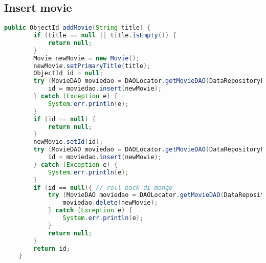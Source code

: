 \subsection{Insert movie}
\begin{lstlisting}[language=Java, caption = Movie insertion]
public ObjectId addMovie(String title) {
        if (title == null || title.isEmpty()) {
            return null;
        }
        Movie newMovie = new Movie();
        newMovie.setPrimaryTitle(title);
        ObjectId id = null;
        try (MovieDAO moviedao = DAOLocator.getMovieDAO(DataRepositoryEnum.MONGO)) {
            id = moviedao.insert(newMovie);
        } catch (Exception e) {
            System.err.println(e);
        }
        if (id == null) {
            return null;
        }
        newMovie.setId(id);
        try (MovieDAO moviedao = DAOLocator.getMovieDAO(DataRepositoryEnum.NEO4j)) {
            id = moviedao.insert(newMovie);
        } catch (Exception e) {
            System.err.println(e);
        }
        if (id == null){ // roll back di mongo
            try (MovieDAO moviedao = DAOLocator.getMovieDAO(DataRepositoryEnum.MONGO)) {
                moviedao.delete(newMovie);
            } catch (Exception e) {
                System.err.println(e);
            }
            return null;
        }
        return id;
    }
\end{lstlisting}

%